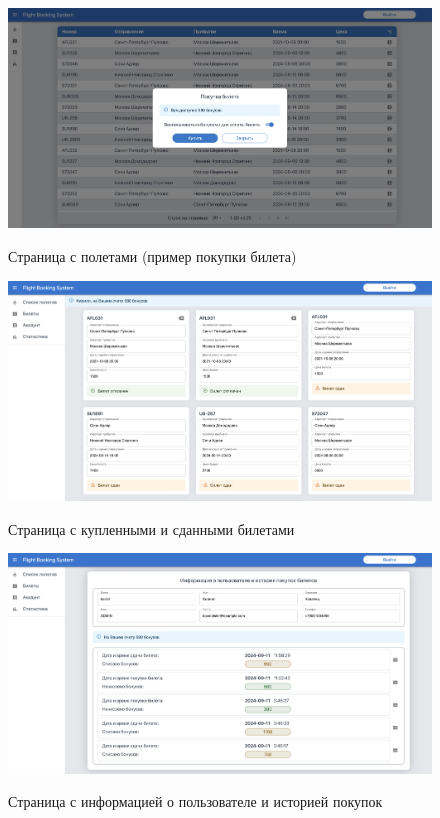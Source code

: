 \begin{figure}[H]
	\begin{center}
		{\includegraphics[scale = 0.25]{../img/pages/page-04.png}}
		\caption{Страница с полетами (пример покупки билета)}
		\label{fig:page-04}
	\end{center}
\end{figure}

\begin{figure}[H]
	\begin{center}
		{\includegraphics[scale = 0.25]{../img/pages/page-05.png}}
		\caption{Страница с купленными и сданными билетами}
		\label{fig:page-05}
	\end{center}
\end{figure}

\begin{figure}[H]
	\begin{center}
		{\includegraphics[scale = 0.25]{../img/pages/page-06.png}}
		\caption{Страница с информацией о пользователе и историей покупок}
		\label{fig:page-06}
	\end{center}
\end{figure}

